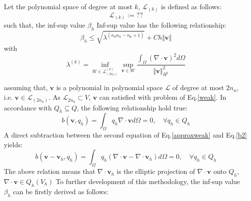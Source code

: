 \begin{thm}
    Let the polynomial space of degree at most $k$, $\mathcal L_{(k)}$ is defined as follows:
\begin{equation}
    \mathcal L_{(k)} := ??
\end{equation}
such that, the inf-sup value $\beta_h$
    Inf-sup value has the following relationship:
\begin{equation}
    \beta_h \le \sqrt{\lambda^{(n_d n_u-n_p+1)}} + C h \Vert \boldsymbol v \Vert
\end{equation}
with
\begin{equation}
    \lambda^{(k)} = \inf_{W \in \mathcal L_{(2n_u)}^{(k)}} \sup_{\boldsymbol v \in W} 
    \frac{\int_\Omega (\nabla \cdot \boldsymbol v)^2 d\Omega}{\Vert \boldsymbol v \Vert_{H^1}^2}
\end{equation}
\end{thm}
\begin{pf}

\end{pf}
assuming that, $\boldsymbol v$ is a polynomial in polynomial space $\mathcal L$ of degree at most $2n_u$, i.e. $\boldsymbol v \in \mathcal L_{(2n_u)}$. 
As $\mathcal L_{2n_u} \subset V$, $\boldsymbol v$ can satisfied with problem of Eq.\eqref{weak}.
In accordance with $Q_h \subseteq Q$, the following relationship hold true:
\begin{equation}\label{b2}
b(\boldsymbol v,q_h) = \int_{\Omega} q_h \nabla \cdot \boldsymbol v d\Omega = 0, \quad \forall q_h \in Q_h
\end{equation}
A direct subtraction between the second equation of Eq.\eqref{approxweak} and Eq.\eqref{b2} yields: 
\begin{equation}
b(\boldsymbol v - \boldsymbol v_h, q_h) = \int_{\Omega} q_h (\nabla\cdot \boldsymbol v - \nabla \cdot \boldsymbol v_h)d\Omega = 0, \quad \forall q_h \in Q_h
\end{equation}
The above relation means that $\nabla \cdot \boldsymbol v_h$ is the elliptic projection of $\nabla \cdot \boldsymbol v$ onto $Q_h$, 
$\nabla \cdot \boldsymbol v \in Q_h(V_h)$
To further development of this methodology, the inf-sup value $\beta_h$ can be firstly derived as follows:
